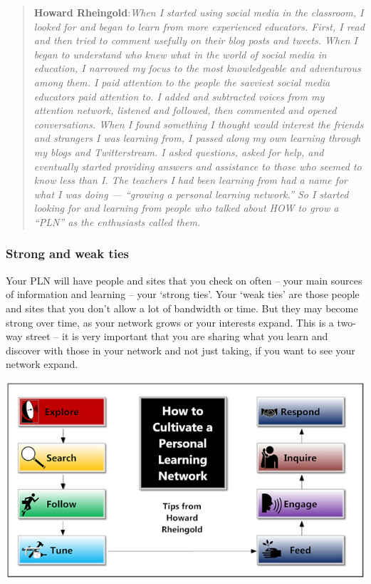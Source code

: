 \begin{quote}
\textbf{Howard Rheingold}:\emph{When I started using social media in the
classroom, I looked for and began to learn from more experienced
educators. First, I read and then tried to comment usefully on their
blog posts and tweets. When I began to understand who knew what in the
world of social media in education, I narrowed my focus to the most
knowledgeable and adventurous among them. I paid attention to the people
the savviest social media educators paid attention to. I added and
subtracted voices from my attention network, listened and followed, then
commented and opened conversations. When I found something I thought
would interest the friends and strangers I was learning from, I passed
along my own learning through my blogs and Twitterstream. I asked
questions, asked for help, and eventually started providing answers and
assistance to those who seemed to know less than I. The teachers I had
been learning from had a name for what I was doing --- ``growing a
personal learning network.'' So I started looking for and learning from
people who talked about HOW to grow a ``PLN'' as the enthusiasts called
them.}
\end{quote}

\subsubsection{\textbf{Strong and weak ties}}

Your PLN will have people and sites that you check on often -- your main
sources of information and learning -- your `strong ties'. Your `weak
ties' are those people and sites that you don't allow a lot of bandwidth
or time. But they may become strong over time, as your network grows or
your interests expand. This is a two-way street -- it is very important
that you are sharing what you learn and discover with those in your
network and not just taking, if you want to see your network expand.

\begin{center}
\includegraphics[width=.7\textwidth]{./pictures/Personal-Learning-Network-900px-v2.jpeg}
\end{center}


